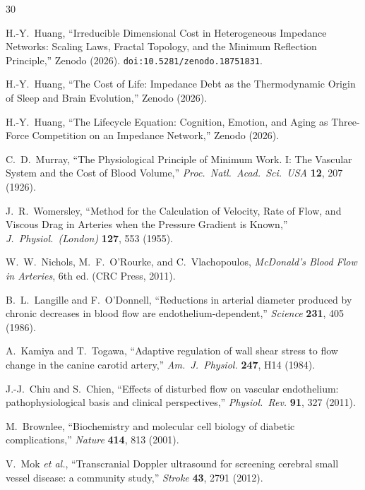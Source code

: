 ﻿\documentclass[aps,pre,twocolumn,superscriptaddress,floatfix]{revtex4-2}
\begin{document}
\begin{thebibliography}{30}

H.-Y.~Huang,
``Irreducible Dimensional Cost in Heterogeneous Impedance Networks:
  Scaling Laws, Fractal Topology, and the Minimum Reflection Principle,''
Zenodo (2026). \texttt{doi:10.5281/zenodo.18751831}.

H.-Y.~Huang,
``The Cost of Life: Impedance Debt as the Thermodynamic Origin
  of Sleep and Brain Evolution,''
Zenodo (2026).

H.-Y.~Huang,
``The Lifecycle Equation: Cognition, Emotion, and Aging as
  Three-Force Competition on an Impedance Network,''
Zenodo (2026).

C.~D.~Murray,
``The Physiological Principle of Minimum Work.
  I: The Vascular System and the Cost of Blood Volume,''
\emph{Proc.\ Natl.\ Acad.\ Sci.\ USA} \textbf{12}, 207 (1926).

J.~R.~Womersley,
``Method for the Calculation of Velocity, Rate of Flow,
  and Viscous Drag in Arteries when the Pressure Gradient is Known,''
\emph{J.\ Physiol.\ (London)} \textbf{127}, 553 (1955).

W.~W.~Nichols, M.~F.~O'Rourke, and C.~Vlachopoulos,
\emph{McDonald's Blood Flow in Arteries},
6th ed. (CRC Press, 2011).

B.~L.~Langille and F.~O'Donnell,
``Reductions in arterial diameter produced by chronic
  decreases in blood flow are endothelium-dependent,''
\emph{Science} \textbf{231}, 405 (1986).

A.~Kamiya and T.~Togawa,
``Adaptive regulation of wall shear stress to flow change
  in the canine carotid artery,''
\emph{Am.\ J.\ Physiol.} \textbf{247}, H14 (1984).

J.-J.~Chiu and S.~Chien,
``Effects of disturbed flow on vascular endothelium:
  pathophysiological basis and clinical perspectives,''
\emph{Physiol.\ Rev.} \textbf{91}, 327 (2011).

M.~Brownlee,
``Biochemistry and molecular cell biology of diabetic complications,''
\emph{Nature} \textbf{414}, 813 (2001).

V.~Mok \emph{et al.},
``Transcranial Doppler ultrasound for screening cerebral
  small vessel disease: a community study,''
\emph{Stroke} \textbf{43}, 2791 (2012).


\end{thebibliography}
\end{document}
